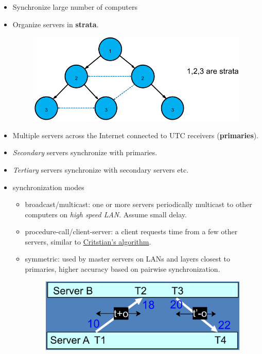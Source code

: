 \documentclass[twocolumn,landscape,10pt]{article}
\theoremstyle{definition}
\begin{document}
\begin{itemize}
    \item Synchronize large number of computers
    \item Organize servers in \textbf{strata}.
        \begin{figure}[h]
            \includegraphics[scale=0.30]{strata.png}
            \centering
        \end{figure}
    \item Multiple servers across the Internet connected to UTC receivers
        (\textbf{primaries}). 
    \item \emph{Secondary} servers synchronize with primaries.
    \item \emph{Tertiary} servers synchronize with secondary servers etc.
    \item synchronization modes
        \begin{itemize}
            \item broadcast/multicast: one or more servers periodically
                multicast to other computers on \emph{high speed LAN}. Assume
                small delay.
            \item procedure-call/client-server: a client requests time from a
                few other servers, similar to \underline{Critstian's algorithm}.
            \item symmetric: used by master servers on LANs and layers closest
                to primaries, higher accuracy based on pairwise synchronization.
                \begin{figure}[h]
                  	\includegraphics[scale=0.30]{symmetric.png}

\end{figure}
\end{itemize}
\end{itemize}
\end{document}
